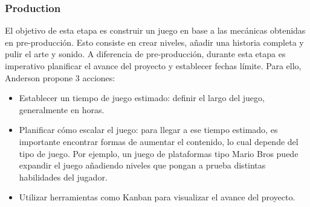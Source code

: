 \subsubsection{Production}
\par El objetivo de esta etapa es construir un juego en base a las mecánicas obtenidas en pre-producción. Esto consiste en crear niveles, añadir una historia completa y pulir el arte y sonido. A diferencia de pre-producción, durante esta etapa es imperativo planificar el avance del proyecto y establecer fechas límite. Para ello, Anderson propone 3 acciones:
\begin{itemize}
  \item Establecer un tiempo de juego estimado: definir el largo del juego, generalmente en horas.
  \item Planificar cómo escalar el juego: para llegar a ese tiempo estimado, es importante encontrar formas de aumentar el contenido, lo cual depende del tipo de juego. Por ejemplo, un juego de plataformas tipo Mario Bros puede expandir el juego añadiendo niveles que pongan a prueba distintas habilidades del jugador.
  \item Utilizar herramientas como Kanban para visualizar el avance del proyecto.
\end{itemize}
%
%
